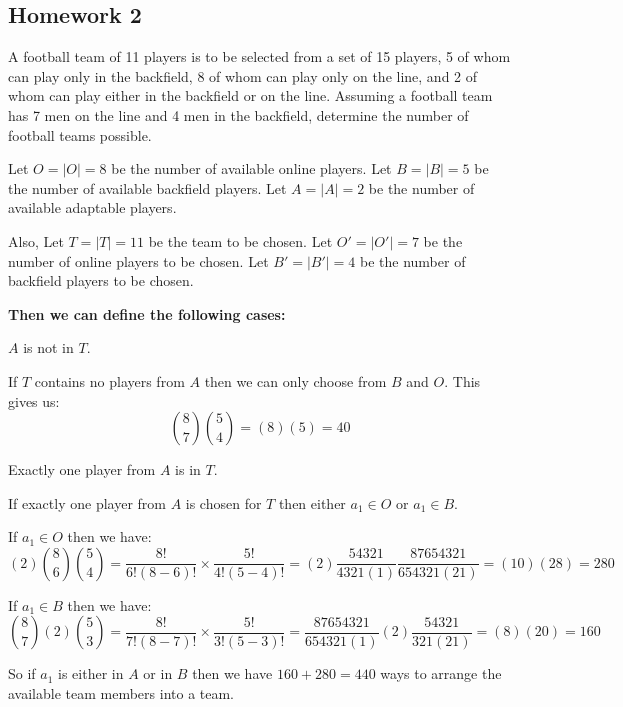 
\subsection{Homework 2}

\begin{prob}
A football team of 11 players is to be selected from a set of 15 players, 5 of whom can play only in the backfield, 8 of whom can play only on the line, and 2 of whom can play either in the backfield or on the line. Assuming a football team has 7 men on the line and 4 men in the backfield, determine the number of football teams possible.
\end{prob}
\bigskip

\begin{sol}
Let ${O} = |O| = 8$ be the number of available online players. 
Let ${B} = |B| = 5$ be the number of available backfield players. 
Let ${A} = |A| = 2$ be the number of available adaptable players. 

Also, 
Let ${T} = |T| = 11$ be the team to be chosen. 
Let ${O'} = |O'| = 7$ be the number of online players to be chosen. 
Let ${B'} = |B'| = 4$ be the number of backfield players to be chosen. 
\end{sol}

\medskip

\textbf{Then we can define the following cases:}

\begin{case}{ ${A}$ is not in ${T}$.}

If ${T}$ contains no players from ${A}$ then we can only choose from ${B}$ and ${O}$. 
This gives us: 
\[\binom{8}{7} \binom{5}{4} = (8)(5) = 40\]
\end{case}

\medskip

\begin{case}{Exactly one player from ${A}$ is in ${T}$.}

	
If exactly one player from ${A}$ is chosen for ${T}$ then either $a_{1} \in {O}$ or $a_{1} \in {B}$. 

 If $a_{1} \in {O}$ then we have: 
\[(2) \binom{8}{6} \binom{5}{4} = \frac{8!}{6!(8-6)!} \times \frac{5!}{4!(5-4)!} = (2) \frac{54321}{4321(1)} \frac{87654321}{654321(21)} = (10)(28) = 280\]

 If $a_{1} \in {B}$ then we have: 
\[\binom{8}{7} (2) \binom{5}{3} = \frac{8!}{7!(8-7)!} \times \frac{5!}{3!(5-3)!} = \frac{87654321}{654321(1)} (2) \frac{54321}{321(21)} = (8)(20) = 160\]


So if $a_{1}$ is either in ${A}$ or in ${B}$ then we have $160+280 = 440$ ways to arrange the available team members into a team. 
\end{case}

